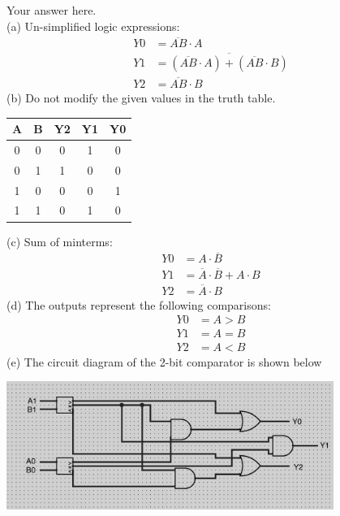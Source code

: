 \documentclass[a4paper]{article}
\begin{document}
\begin{answer}[Question 1]
    Your answer here.\\
    (a) Un-simplified logic expressions: \\
    \begin{align*} 
        Y0 &= \overline{AB} \cdot A\\
        Y1 &= \overline{(\overline{AB} \cdot A) + (\overline{AB} \cdot B)} \\
        Y2 &= \overline{AB} \cdot B
    \end{align*}
    (b) Do not modify the given values in the truth table.\\
    \begin{center}
        \begin{tabular}{ |c|c||c|c|c| } 
         \hline
         A & B & Y2 & Y1 & Y0 \\ 
         \hline
         0 & 0 & 0 & 1 & 0  \\ 
         \hline
         0 & 1 & 1 & 0 &  0 \\ 
         \hline
         1 & 0 & 0 & 0 &  1 \\
         \hline
         1 & 1 & 0 & 1 &  0 \\
         \hline
        \end{tabular}
    \end{center}
    (c) Sum of minterms: \\
    \begin{align*} 
        Y0 &= A \cdot \overline{B} \\
        Y1 &= \overline{A} \cdot \overline{B} + A \cdot B \\
        Y2 &= \overline{A} \cdot B
    \end{align*}
    (d) The outputs represent the following comparisons: \\
    \begin{align*} 
        Y0 &= A > B \\
        Y1 &= A = B \\
        Y2 &= A < B
    \end{align*}
    (e) The circuit diagram of the 2-bit comparator is shown below\\
    \begin{center}
        \includegraphics[width=0.8\textwidth]{p1.jpg}
    \end{center}
\end{answer}
\end{document}
